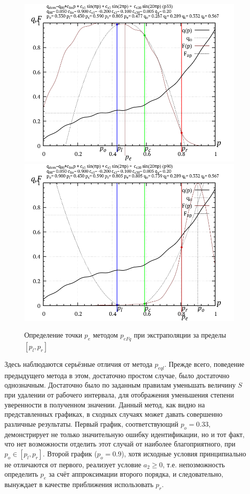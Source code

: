 \begin{figure}[htb!]
  \centerline{
    \includegraphics[width=49\TW]{p/p_eFq/q_p_eFq_p33.png}
    \hfill
    \includegraphics[width=49\TW]{p/p_eFq/q_p_eFq_p90.png}
  }
  \caption{Определение точки $p_e$ методом $p_{eFq}$ при экстраполяции за пределы $[p_l,p_r]$ }
  \label{atu:f:p_eFq_extra}
\end{figure}

Здесь наблюдаются серьёзные отличия от метода $p_{eql}$.
Прежде всего, поведение предыдущего метода
в этом, достаточно простом случае, было достаточно однозначным.
Достаточно было по заданным правилам уменьшать величину $S$
при удалении от рабочего интервала, для отображения
уменьшения степени уверенности в полученном значении.
Данный метод, как видно на представленных графиках,
в сходных случаях может давать совершенно различные результаты.
Первый график, соответствующий $p_o=0.33$,
демонстрирует не только значительную ошибку идентификации,
но и тот факт, что нет возможности отделить этот случай от
наиболее благоприятного, при $p_o \in [p_l,p_r]$.
Второй график ($p_o=0.9$), хотя исходные условия принципиально не отличаются
от первого, реализует условие $a_2 \ge 0 $, т.е. непозможность
определить $p_e$ за счёт аппроксимации второго порядка, и следовательно,
вынуждает в качестве приближения использовать $p_r$.

